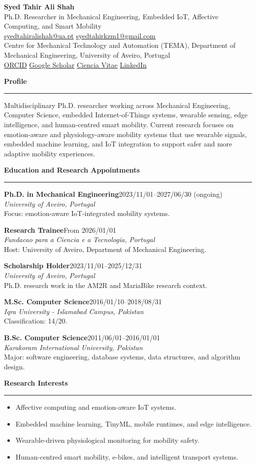 \documentclass[11pt,a4paper]{article}
\newcommand{\cvsection}[1]{%
  \vspace{8pt}
  {\large\bfseries\color{accent} #1}\\[-2pt]
  \rule{\linewidth}{0.4pt}
  \vspace{2pt}
}
\newcommand{\entry}[4]{%
  \textbf{#1}\hfill{\small #2}\\
  \textit{#3}\\
  #4
  \vspace{4pt}
}
\begin{document}
{\LARGE\bfseries Syed Tahir Ali Shah}\\
{\large Ph.D. Researcher in Mechanical Engineering, Embedded IoT, Affective Computing, and Smart Mobility}\\[4pt]
\href{mailto:syedtahiralishah@ua.pt}{syedtahiralishah@ua.pt} \quad
\href{mailto:syedtahirkzm1@gmail.com}{syedtahirkzm1@gmail.com}\\
Centre for Mechanical Technology and Automation (TEMA), Department of Mechanical Engineering, University of Aveiro, Portugal\\
\href{https://orcid.org/0000-0003-0001-1810}{ORCID} \quad
\href{https://scholar.google.com/citations?user=VED2-h4AAAAJ}{Google Scholar} \quad
\href{https://www.cienciavitae.pt//F712-C83E-0EFB}{Ciencia Vitae} \quad
\href{https://pt.linkedin.com/in/syed-tahir-ali-shah-a1582897}{LinkedIn}

\cvsection{Profile}
Multidisciplinary Ph.D. researcher working across Mechanical Engineering, Computer Science, embedded Internet-of-Things systems, wearable sensing, edge intelligence, and human-centred smart mobility. Current research focuses on emotion-aware and physiology-aware mobility systems that use wearable signals, embedded machine learning, and IoT integration to support safer and more adaptive mobility experiences.

\cvsection{Education and Research Appointments}
\entry{Ph.D. in Mechanical Engineering}{2023/11/01--2027/06/30 (ongoing)}{University of Aveiro, Portugal}{Focus: emotion-aware IoT-integrated mobility systems.}
\entry{Research Trainee}{From 2026/01/01}{Fundacao para a Ciencia e a Tecnologia, Portugal}{Host: University of Aveiro, Department of Mechanical Engineering.}
\entry{Scholarship Holder}{2023/11/01--2025/12/31}{University of Aveiro, Portugal}{Ph.D. research work in the AM2R and MariaBike research context.}
\entry{M.Sc. Computer Science}{2016/01/10--2018/08/31}{Iqra University - Islamabad Campus, Pakistan}{Classification: 14/20.}
\entry{B.Sc. Computer Science}{2011/06/01--2016/01/01}{Karakoram International University, Pakistan}{Major: software engineering, database systems, data structures, and algorithm design.}

\cvsection{Research Interests}
\begin{itemize}
  \item Affective computing and emotion-aware IoT systems.
  \item Embedded machine learning, TinyML, mobile runtimes, and edge intelligence.
  \item Wearable-driven physiological monitoring for mobility safety.
  \item Human-centred smart mobility, e-bikes, and intelligent transport systems.
\end{itemize}
\end{document}
